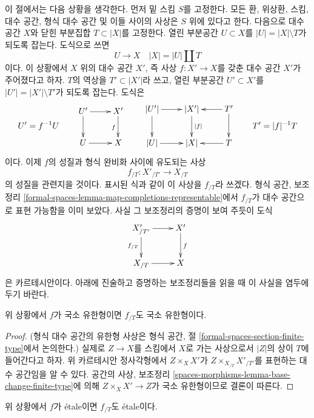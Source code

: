 \noindent
이 절에서는 다음 상황을 생각한다.
먼저 밑 스킴 $S$를 고정한다. 모든 환, 위상환, 스킴, 대수 공간,
형식 대수 공간 및 이들 사이의 사상은 $S$ 위에 있다고 한다.
다음으로 대수 공간 $X$와 닫힌 부분집합 $T \subset |X|$를 고정한다.
열린 부분공간 $U \subset X$를 $|U| = |X| \setminus T$가 되도록 잡는다.
도식으로 쓰면
$$
U \to X \quad |X| = |U| \amalg T
$$
이다. 이 상황에서 $X$ 위의 대수 공간 $X'$, 즉 사상
$f : X' \to X$를 갖춘 대수 공간 $X'$가 주어졌다고 하자.
$T$의 역상을 $T' \subset |X'|$라 쓰고, 열린 부분공간
$U' \subset X'$를 $|U'| = |X'| \setminus T'$가 되도록 잡는다. 도식은
$$
U' = f^{-1}U
\quad\quad
\vcenter{
\xymatrix{
U' \ar[d] \ar[r] & X' \ar[d]_f \\
U \ar[r] & X
}
}
\quad\quad
\vcenter{
\xymatrix{
|U'| \ar[r] \ar[d] & |X'| \ar[d]^{|f|} & T' \ar[l] \ar[d] \\
|U| \ar[r] & |X| & T \ar[l]
}
}
\quad\quad
T' = |f|^{-1}T
$$
이다. 이제 $f$의 성질과 형식 완비화 사이에 유도되는 사상
$$
f_{/T} : X'_{/T'} \longrightarrow X_{/T}
$$
의 성질을 관련지을 것이다. 표시된 식과 같이 이 사상을
$f_{/T}$라 쓰겠다. 형식 공간, 보조정리
\ref{formal-spaces-lemma-map-completions-representable}에서
$f_{/T}$가 대수 공간으로 표현 가능함을 이미 보았다.
사실 그 보조정리의 증명이 보여 주듯이 도식
$$
\xymatrix{
X'_{/T'} \ar[d]_{f_{/T}} \ar[r] & X' \ar[d]^f \\
X_{/T} \ar[r] & X
}
$$
은 카르테시안이다. 아래에 진술하고 증명하는 보조정리들을 읽을 때
이 사실을 염두에 두기 바란다.

\begin{lemma}
\label{lemma-map-completions-finite-type}
위 상황에서 $f$가 국소 유한형이면 $f_{/T}$도 국소 유한형이다.
\end{lemma}

\begin{proof}
(형식 대수 공간의 유한형 사상은 형식 공간, 절
\ref{formal-spaces-section-finite-type}에서 논의한다.)
실제로 $Z \to X$를 스킴에서 $X$로 가는 사상으로서
$|Z|$의 상이 $T$에 들어간다고 하자. 위 카르테시안 정사각형에서
$Z \times_X X'$가 $Z \times_{X_{/T}} X'_{/T'}$를 표현하는
대수 공간임을 알 수 있다. 공간의 사상, 보조정리
\ref{spaces-morphisms-lemma-base-change-finite-type}에 의해
$Z \times_X X' \to Z$가 국소 유한형이므로 결론이 따른다.
\end{proof}

\begin{lemma}
\label{lemma-map-completions-etale}
위 상황에서 $f$가 \'etale이면 $f_{/T}$도 \'etale이다.
\end{lemma}


